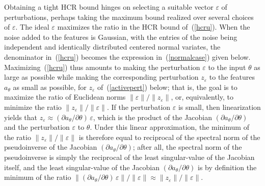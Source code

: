 \documentclass[]{fairmeta}
\renewcommand{\epsilon}{\varepsilon}
\begin{document}
Obtaining a tight HCR bound hinges on selecting a suitable vector $\epsilon$
of perturbations, perhaps taking the maximum bound realized
over several choices of $\epsilon$.
The ideal $\epsilon$ maximizes the ratio in the HCR bound of~(\ref{hcru}).
When the noise added to the features is Gaussian,
with the entries of the noise being independent and identically distributed
centered normal variates, the denominator in~(\ref{hcru})
becomes the expression in~(\ref{normalcase}) given below.
Maximizing~(\ref{hcru}) thus amounts to making the perturbation $\epsilon$
to the input $\theta$ as large as possible while making
the corresponding perturbation $z_{\epsilon}$
to the features $a_{\theta}$ as small as possible,
for $z_{\epsilon}$ of~(\ref{activepert}) below;
that is, the goal is to maximize the ratio of Euclidean norms
$\|\epsilon\| / \|z_{\epsilon}\|$, or, equivalently,
to minimize the ratio $\|z_{\epsilon}\|/ \|\epsilon\|$.
If the perturbation $\epsilon$ is small, then linearization yields that
$z_{\epsilon} \approx (\partial a_{\theta} / \partial \theta) \, \epsilon$,
which is the product of the Jacobian $(\partial a_{\theta} / \partial \theta)$
and the perturbation $\epsilon$ to $\theta$.
Under this linear approximation, the minimum of the ratio
$\|z_{\epsilon}\| / \|\epsilon\|$ is therefore equal to reciprocal
of the spectral norm of the pseudoinverse
of the Jacobian $(\partial a_{\theta} / \partial \theta)$;
after all, the spectral norm of the pseudoinverse is simply the reciprocal
of the least singular-value of the Jacobian itself,
and the least singular-value of the Jacobian
$(\partial a_{\theta} / \partial \theta)$
is by definition the minimum of the ratio
$\|(\partial a_{\theta} / \partial \theta) \, \epsilon\| / \|\epsilon\|
\approx \|z_{\epsilon}\| / \|\epsilon\|$.
\end{document}
